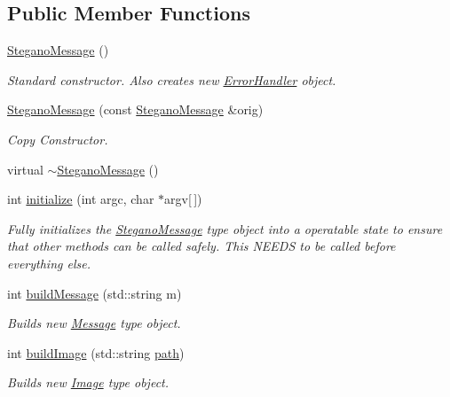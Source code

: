\subsection*{Public Member Functions}
\begin{DoxyCompactItemize}
\item 
\mbox{\hyperlink{classSteganoMessage_a7a14cbd03ebca6764f8b234f8dcd1697}{Stegano\+Message}} ()
\begin{DoxyCompactList}\small\item\em Standard constructor. Also creates new \mbox{\hyperlink{classErrorHandler}{Error\+Handler}} object. \end{DoxyCompactList}\item 
\mbox{\hyperlink{classSteganoMessage_a67a8a4a8aae12db32bb758e6cd44b16a}{Stegano\+Message}} (const \mbox{\hyperlink{classSteganoMessage}{Stegano\+Message}} \&orig)
\begin{DoxyCompactList}\small\item\em Copy Constructor. \end{DoxyCompactList}\item 
virtual \mbox{\hyperlink{classSteganoMessage_af60430fa53ebe9ee44e60d906b67059d}{$\sim$\+Stegano\+Message}} ()
\item 
int \mbox{\hyperlink{classSteganoMessage_aeb4d2b69498c148508e2ca70194679cc}{initialize}} (int argc, char $\ast$argv\mbox{[}$\,$\mbox{]})
\begin{DoxyCompactList}\small\item\em Fully initializes the \mbox{\hyperlink{classSteganoMessage}{Stegano\+Message}} type object into a operatable state to ensure that other methods can be called safely. This N\+E\+E\+DS to be called before everything else. \end{DoxyCompactList}\item 
int \mbox{\hyperlink{classSteganoMessage_a43a7d1579509a4004a86ad70dad10f65}{build\+Message}} (std\+::string m)
\begin{DoxyCompactList}\small\item\em Builds new \mbox{\hyperlink{classMessage}{Message}} type object. \end{DoxyCompactList}\item 
int \mbox{\hyperlink{classSteganoMessage_ad90a4cf8cf03febfb4c3df955ccab13d}{build\+Image}} (std\+::string \mbox{\hyperlink{classSteganoMessage_a399f4c181d3b7b15ccdb5c925a7a1f51}{path}})
\begin{DoxyCompactList}\small\item\em Builds new \mbox{\hyperlink{classImage}{Image}} type object. \end{DoxyCompactList}\item 

\end{DoxyCompactItemize}
